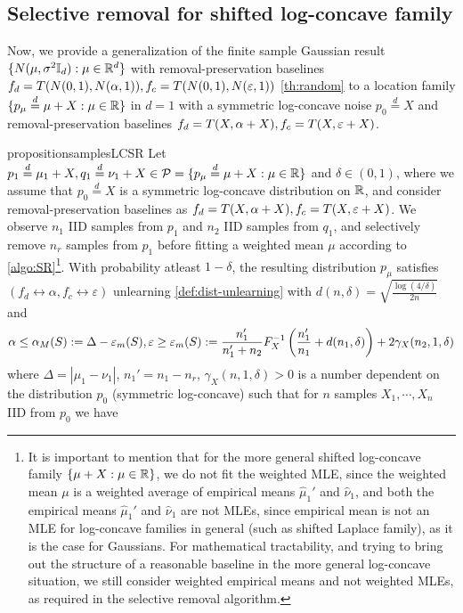 \subsection{Selective removal for shifted log-concave family}
Now, we provide a generalization of the finite sample Gaussian result $\{N(\mu, \sigma^2\mathbb{I}_d): \mu\in \mathbb{R}^d\}$ with removal-preservation baselines $f_d= T(N(0,1), N(\alpha, 1)), f_c=T(N(0,1), N(\varepsilon,1))$ \ref{th:random} to a location family $\{p_{\mu} \overset{d}{=} \mu+X: \mu \in \mathbb{R}\}$ in $d=1$ with a symmetric log-concave noise $p_0 \overset{d}{=}X$ and removal-preservation baselines $f_d= T(X, \alpha+X), f_c=T(X,\varepsilon+X)$.
\begin{restatable}{proposition}{samplesLCSR}
\label{th:randomLCSR}
Let $p_1\overset{d}{=}\mu_1+X, q_1\overset{d}{=} \nu_1+ X \in \mathcal{P}= \{p_{\mu} \overset{d}{=} \mu+X: \mu \in \mathbb{R}\}$ and $\delta \in (0,1)$, where we assume that $p_0\overset{d}{=}X$ is a symmetric log-concave distribution on $\mathbb{R}$, and consider removal-preservation baselines as $f_d= T(X, \alpha+X), f_c=T(X,\varepsilon+X)$. We observe $n_1$ IID samples from $p_1$ and $n_2$ IID samples from $q_1$, and selectively remove $n_r$ samples from $p_1$ before fitting a weighted mean $\mu$ according to  \ref{algo:SR}\footnote{It is important to mention that for the more general shifted log-concave family $\{\mu+X:\mu\in \mathbb{R}\}$, we do not fit the weighted MLE, since the weighted mean $\mu$ is a weighted average of empirical means $\hat{\mu}_1'$ and $\hat{\nu}_1$, and both the empirical means  $\hat{\mu}_1'$ and $\hat{\nu}_1$ are not MLEs, since empirical mean is not an MLE for log-concave families in general (such as shifted Laplace family), as it is the case for Gaussians. For mathematical tractability, and trying to bring out the structure of a reasonable baseline in the more general log-concave situation, we still consider weighted empirical means and not weighted MLEs, as required in the selective removal algorithm.}. With probability atleast $1 - \delta$, the resulting  distribution $p_{\mu}$ satisfies $(f_d \leftrightarrow \alpha,f_c\leftrightarrow  \varepsilon)$  unlearning \ref{def:dist-unlearning} with $d(n, \delta)= \sqrt{\frac{\log (4/\delta)}{2n}}$ and 
\begin{align*}
\alpha  \leq \alpha_M(S):= \Delta - \varepsilon_m(S),
\varepsilon \geq  \varepsilon_m(S):= \frac{n_1'}{n_1' + n_2} 
   F_X^{-1}\left(\frac{n_1'}{n_1} +d(n_1, \delta)\right) + 2\gamma_X(n_2,1,\delta)
\end{align*}
where $\Delta = |\mu_1- \nu_1|$, $n_1'= n_1- n_r$, $\gamma_X(n, 1, \delta)>0$ is a number dependent on the distribution $p_0$ (symmetric log-concave) such that for $n$ samples $X_1, \cdots, X_n$   IID from $p_0$ we have 

\end{restatable}
